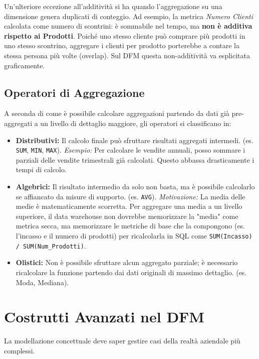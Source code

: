 Un'ulteriore eccezione all'additività si ha quando l'aggregazione su una dimensione genera duplicati di conteggio. Ad esempio, la metrica \textit{Numero Clienti} calcolata come numero di scontrini: è sommabile nel tempo, ma \textbf{non è additiva rispetto ai Prodotti}. Poiché uno stesso cliente può comprare più prodotti in uno stesso scontrino, aggregare i clienti per prodotto porterebbe a contare la stessa persona più volte (overlap). Sul DFM questa non-additività va esplicitata graficamente.

\subsection{Operatori di Aggregazione}
A seconda di come è possibile calcolare aggregazioni partendo da dati già pre-aggregati a un livello di dettaglio maggiore, gli operatori si classificano in:

\begin{itemize}
    \item \textbf{Distributivi:} Il calcolo finale può sfruttare risultati aggregati intermedi. (es. \texttt{SUM}, \texttt{MIN}, \texttt{MAX}). 
    \textit{Esempio:} Per calcolare le vendite annuali, posso sommare i parziali delle vendite trimestrali già calcolati. Questo abbassa drasticamente i tempi di calcolo.
    \item \textbf{Algebrici:} Il risultato intermedio da solo non basta, ma è possibile calcolarlo se affiancato da misure di supporto. (es. \texttt{AVG}).
    \textit{Motivazione:} La media delle medie è matematicamente scorretta. Per aggregare una media a un livello superiore, il data warehouse non dovrebbe memorizzare la "media" come metrica secca, ma memorizzare le metriche di base che la compongono (es. l'incasso e il numero di prodotti) per ricalcolarla in SQL come \texttt{SUM(Incasso) / SUM(Num\_Prodotti)}.
    \item \textbf{Olistici:} Non è possibile sfruttare alcun aggregato parziale; è necessario ricalcolare la funzione partendo dai dati originali di massimo dettaglio. (es. Moda, Mediana).
\end{itemize}

\section{Costrutti Avanzati nel DFM}

La modellazione concettuale deve saper gestire casi della realtà aziendale più complessi.

